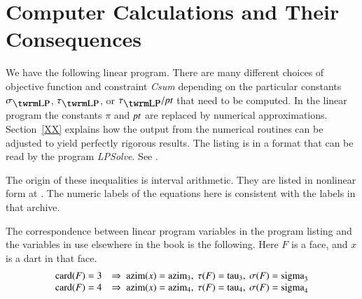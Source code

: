 \section{Computer Calculations and Their Consequences}
\label{sec:ccc}

We have the following linear program. There are many different
choices of objective function and constraint {\it Csum} depending on
the particular constants $\sLP$, $\tauLP$, or $\tlp/\pt$ that need
to be computed.  In the linear program the constants $\pi$ and $\hbox{\it pt}$
are replaced by numerical approximations.  Section~\ref{XX} explains
how the output from the numerical routines can be adjusted to yield
perfectly rigorous results.  The listing is in a format that can be
read by the program {\it LPSolve}.  See \cite{lpsolve}.

The origin of these inequalities is interval arithmetic.  They are
listed in nonlinear form at \cite{XX}.  The numeric labels of the
equations here is consistent with the labels in that archive.

The correspondence between linear program variables in the program
listing and the variables in use elsewhere in the book is the
following.  Here $F$ is a face, and $x$ is a dart in that face.
    $$
    \begin{array}{lll}
    \card(F)=3 &\Rightarrow\  \azim(x)=\azim_3,\ \tau(F)=\op{tau}_3,\ \sigma(F)=\op{sigma}_3\\
    \card(F)=4 &\Rightarrow\  \azim(x)=\azim_4,\ \tau(F)=\op{tau}_4,\ \sigma(F)=\op{sigma}_4\\
    \end{array}
    $$

